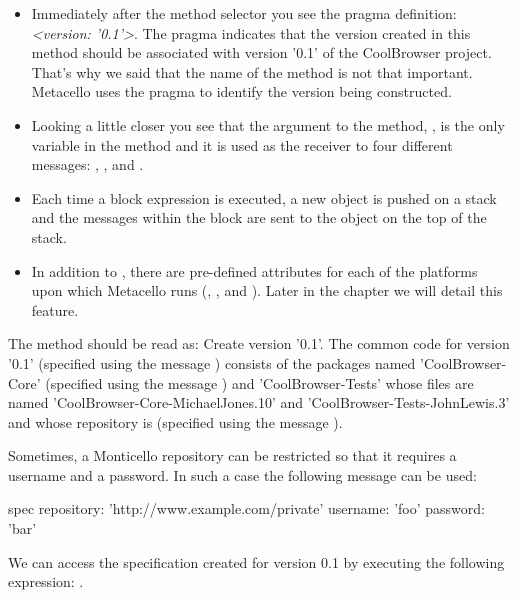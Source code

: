 \documentclass[a4paper,10pt,twoside]{book}
\begin{document}
\begin{itemize}
\item Immediately after the method selector you see the pragma definition:  {\em <version: '0.1'>}. The pragma indicates that the version created in this method should be associated with version '0.1' of the CoolBrowser project. That's why we said that the name of the method is not that important. Metacello uses the pragma to identify the version being constructed.

\item Looking a little closer you see that the argument to the method, , is the only variable in
the method and it is used as the receiver to four different messages:    ,    ,    and  .

\item Each time a block expression is executed, a new object is pushed on a stack and the messages within the block are sent to the object on the top of the stack.

\item In addition to , there are pre-defined attributes for each of the platforms upon which Metacello runs (, ,  and ). Later in the chapter we will detail this feature. 
\end{itemize}


The  method  should be read as: Create version '0.1'. The common code for version '0.1' (specified using the message ) consists of the packages named 'CoolBrowser-Core' (specified using the message ) and 'CoolBrowser-Tests'  whose files are named 'CoolBrowser-Core-MichaelJones.10' and 'CoolBrowser-Tests-JohnLewis.3' and whose repository is  (specified using the message ).

Sometimes, a Monticello repository can be restricted so that it requires a username and a password. In such a case the following message can be used:

\begin{code}{}
         spec repository: 'http://www.example.com/private' username: 'foo' password: 'bar' 
\end{code}

We can access the specification created for version 0.1 by executing the following expression: . 
\end{document}
